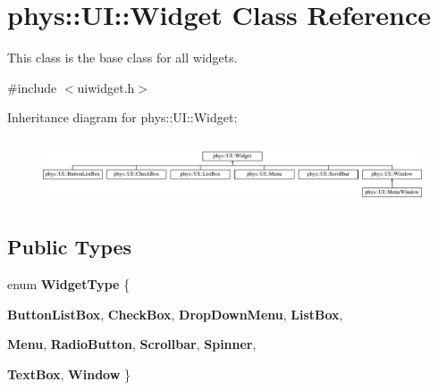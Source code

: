 \hypertarget{classphys_1_1UI_1_1Widget}{
\section{phys::UI::Widget Class Reference}
\label{d9/d48/classphys_1_1UI_1_1Widget}
}


This class is the base class for all widgets.  




{\ttfamily \#include $<$uiwidget.h$>$}

Inheritance diagram for phys::UI::Widget:\begin{figure}[H]
\begin{center}
\leavevmode
\includegraphics[height=1.917808cm]{d9/d48/classphys_1_1UI_1_1Widget}
\end{center}
\end{figure}
\subsection*{Public Types}
\begin{DoxyCompactItemize}
\item 
enum {\bfseries WidgetType} \{ \par
{\bfseries ButtonListBox}, 
{\bfseries CheckBox}, 
{\bfseries DropDownMenu}, 
{\bfseries ListBox}, 
\par
{\bfseries Menu}, 
{\bfseries RadioButton}, 
{\bfseries Scrollbar}, 
{\bfseries Spinner}, 
\par
{\bfseries TextBox}, 
{\bfseries Window}
 \}
\end{DoxyCompactItemize}
